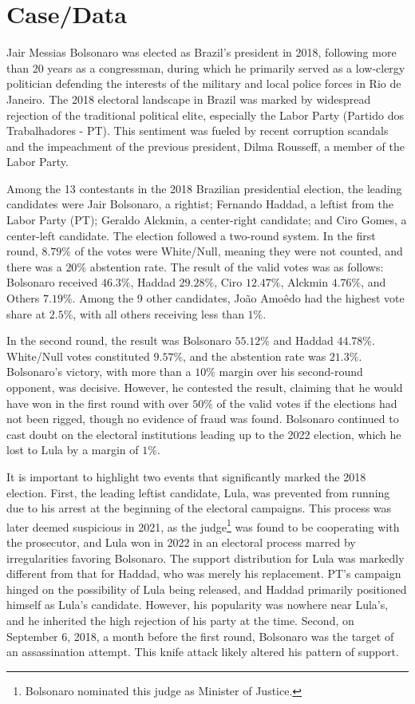 \documentclass[hidelinks,11pt]{article} \usepackage[utf8]{inputenc}
\begin{document}
\section{Case/Data}
 Jair Messias Bolsonaro was elected as Brazil's president in 2018, following more than 20 years as a congressman, during which he primarily served as a low-clergy politician defending the interests of the military and local police forces in Rio de Janeiro. The 2018 electoral landscape in Brazil was marked by widespread rejection of the traditional political elite, especially the Labor Party (Partido dos Trabalhadores - PT). This sentiment was fueled by recent corruption scandals and the impeachment of the previous president, Dilma Rousseff, a member of the Labor Party.

Among the 13 contestants in the 2018 Brazilian presidential election, the leading candidates were Jair Bolsonaro, a rightist; Fernando Haddad, a leftist from the Labor Party (PT); Geraldo Alckmin, a center-right candidate; and Ciro Gomes, a center-left candidate. The election followed a two-round system. In the first round, \(8.79\%\) of the votes were White/Null, meaning they were not counted, and there was a \(20\%\) abstention rate. The result of the valid votes was as follows: Bolsonaro received \(46.3\%\), Haddad \(29.28\%\), Ciro \(12.47\%\), Alckmin \(4.76\%\), and Others \(7.19\%\). Among the 9 other candidates, Jo\~ao Amo\^edo had the highest vote share at \(2.5\%\), with all others receiving less than \(1\%\).

In the second round, the result was Bolsonaro \(55.12\%\) and Haddad \(44.78\%\). White/Null votes constituted \(9.57\%\), and the abstention rate was \(21.3\%\). Bolsonaro's victory, with more than a \(10\%\) margin over his second-round opponent, was decisive. However, he contested the result, claiming that he would have won in the first round with over \(50\%\) of the valid votes if the elections had not been rigged, though no evidence of fraud was found. Bolsonaro continued to cast doubt on the electoral institutions leading up to the 2022 election, which he lost to Lula by a margin of \(1\%\).


It is important to highlight two events that significantly marked the 2018 election. First, the leading leftist candidate, Lula, was prevented from running due to his arrest at the beginning of the electoral campaigns. This process was later deemed suspicious in 2021, as the judge\footnote{Bolsonaro nominated this judge as Minister of Justice.} was found to be cooperating with the prosecutor, and Lula won in 2022 in an electoral process marred by irregularities favoring Bolsonaro. The support distribution for Lula was markedly different from that for Haddad, who was merely his replacement. PT's campaign hinged on the possibility of Lula being released, and Haddad primarily positioned himself as Lula's candidate. However, his popularity was nowhere near Lula's, and he inherited the high rejection of his party at the time. Second, on September 6, 2018, a month before the first round, Bolsonaro was the target of an assassination attempt. This knife attack likely altered his pattern of support.
\end{document}
